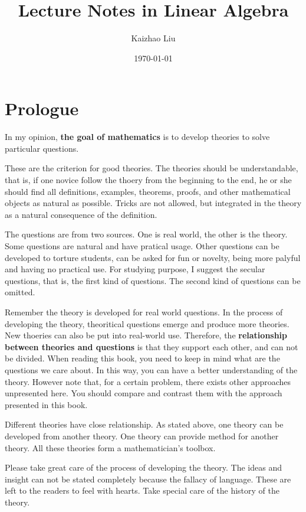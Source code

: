\documentclass{book}
\title{Lecture Notes in Linear Algebra}
\author{Kaizhao Liu}
\date{\today}
\begin{document}
\maketitle
\tableofcontents
\section{Prologue}
In my opinion, \textbf{the goal of mathematics} is to develop theories to solve particular questions. \par
These are the criterion for good theories. The theories should be understandable, that is, if one novice follow the thoery from the beginning to the end, he or she should find all definitions, examples, theorems, proofs, and other mathematical objects as natural as possible. Tricks are not allowed, but integrated in the theory as a natural consequence of the definition. \par
The questions are from two sources. One is real world, the other is the theory. Some questions are natural and have pratical usage. Other questions can be developed to torture students, can be asked for fun or novelty, being more palyful and having no practical use. For studying purpose, I suggest the secular questions, that is, the first kind of questions. The second kind of questions can be omitted.\par
Remember the theory is developed for real world questions. In the process of developing the theory, theoritical questions emerge and produce more theories. New thoeries can also be put into real-world use. Therefore, the \textbf{relationship between theories and questions} is that they support each other, and can not be divided. When reading this book, you need to keep in mind what are the questions we care about. In this way, you can have a better understanding of the theory. However note that, for a certain problem, there exists other approaches unpresented here. You should compare and contrast them with the approach presented in this book.\par
Different theories have close relationship. As stated above, one theory can be developed from another theory. One theory can provide method for another theory. All these theories form a mathematician's toolbox.\par
Please take great care of the process of developing the theory. The ideas and insight can not be stated completely because the fallacy of language. These are left to the readers to feel with hearts. Take special care of the history of the theory. \par
\end{document}
